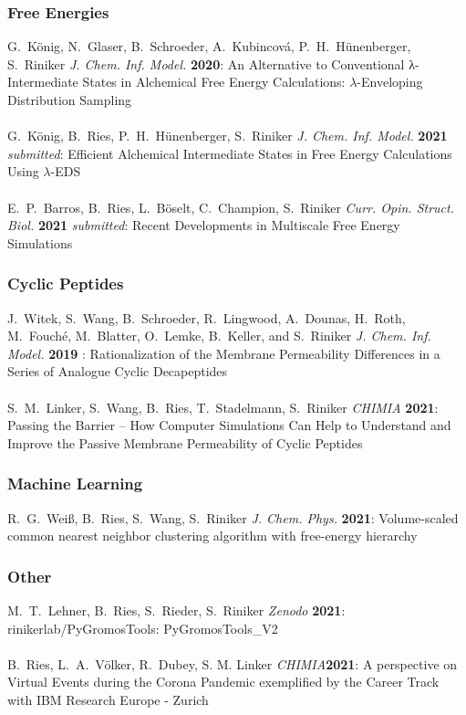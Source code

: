\subsubsection*{Free Energies}

G.\ K\"onig, N.\ Glaser, B.\ Schroeder, A.\ Kubincová, P.\ H.\ H\"unenberger, S.\ Riniker {\em J. Chem. Inf. Model.} {\bf 2020}:
An Alternative to Conventional λ-Intermediate States in Alchemical Free Energy Calculations: $\lambda$-Enveloping Distribution Sampling
\\\\
G.\ K\"onig, B.\ Ries, P.\ H.\ H\"unenberger, S.\ Riniker {\em J. Chem. Inf. Model.} {\bf 2021} {\em submitted}:
Efficient Alchemical Intermediate States in Free Energy Calculations Using  $\lambda$-EDS
\\\\
E.\ P.\ Barros, B.\ Ries, L.\ B\"oselt, C.\ Champion, S.\ Riniker {\em Curr. Opin. Struct. Biol.} {\bf 2021} {\em submitted}:
Recent Developments in Multiscale Free Energy Simulations


\subsubsection*{Cyclic Peptides}

J.\ Witek, S.\ Wang, B.\ Schroeder, R.\ Lingwood, A.\ Dounas, H.\ Roth, M.\ Fouché, M.\ Blatter, O.\ Lemke, B.\ Keller, and S.\ Riniker {\em J. Chem. Inf. Model.} {\bf 2019} :
Rationalization of the Membrane Permeability Differences in a Series of Analogue Cyclic Decapeptides
\\\\
S.\ M.\ Linker, S.\ Wang, B.\ Ries, T.\ Stadelmann, S.\ Riniker {\em CHIMIA} {\bf 2021}: 
Passing the Barrier – How Computer Simulations Can Help to Understand and Improve the Passive Membrane Permeability of Cyclic Peptides


\subsubsection*{Machine Learning}

R.\ G.\ Wei\ss, B.\ Ries, S.\ Wang, S.\ Riniker {\em J. Chem. Phys.} {\bf 2021}:
Volume-scaled common nearest neighbor clustering algorithm with free-energy hierarchy 


\subsubsection*{Other}

M.\ T.\ Lehner, B.\ Ries, S.\ Rieder, S.\ Riniker {\em Zenodo} {\bf 2021}: rinikerlab/PyGromosTools: PyGromosTools\_V2
\\\\
B.\ Ries, L.\ A.\ V\"olker, R.\ Dubey, S. M. Linker {\em CHIMIA}{\bf 2021}: A perspective on Virtual Events during the Corona Pandemic exemplified by the Career Track with IBM Research Europe - Zurich